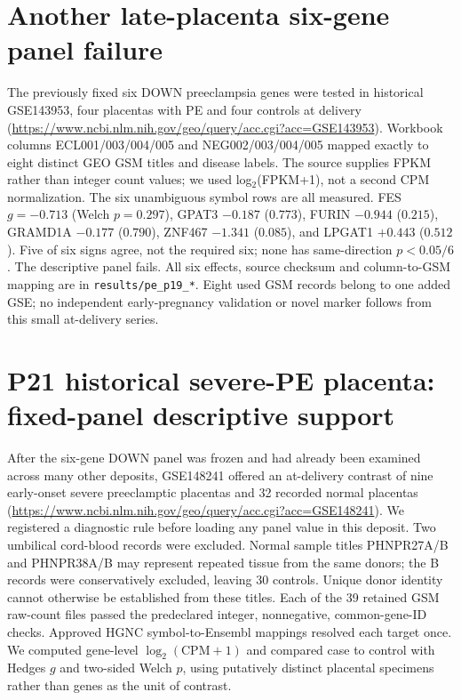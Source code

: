 \documentclass[11pt,a4paper]{article}
\begin{document}
\section{Another late-placenta six-gene panel failure}
The previously fixed six DOWN preeclampsia genes were tested in historical GSE143953, four placentas with PE and four controls at delivery (\url{https://www.ncbi.nlm.nih.gov/geo/query/acc.cgi?acc=GSE143953}). Workbook columns ECL001/003/004/005 and NEG002/003/004/005 mapped exactly to eight distinct GEO GSM titles and disease labels. The source supplies FPKM rather than integer count values; we used log$_2$(FPKM+1), not a second CPM normalization. The six unambiguous symbol rows are all measured. FES $g=-0.713$ (Welch $p=0.297$), GPAT3 $-0.187$ ($0.773$), FURIN $-0.944$ ($0.215$), GRAMD1A $-0.177$ ($0.790$), ZNF467 $-1.341$ ($0.085$), and LPGAT1 $+0.443$ ($0.512$). Five of six signs agree, not the required six; none has same-direction $p<0.05/6$. The descriptive panel fails. All six effects, source checksum and column-to-GSM mapping are in \texttt{results/pe\_p19\_*}. Eight used GSM records belong to one added GSE; no independent early-pregnancy validation or novel marker follows from this small at-delivery series.

\section{P21 historical severe-PE placenta: fixed-panel descriptive support}
After the six-gene DOWN panel was frozen and had already been examined across many other deposits, GSE148241 offered an at-delivery contrast of nine early-onset severe preeclamptic placentas and 32 recorded normal placentas (\url{https://www.ncbi.nlm.nih.gov/geo/query/acc.cgi?acc=GSE148241}). We registered a diagnostic rule before loading any panel value in this deposit. Two umbilical cord-blood records were excluded. Normal sample titles PHNPR27A/B and PHNPR38A/B may represent repeated tissue from the same donors; the B records were conservatively excluded, leaving 30 controls. Unique donor identity cannot otherwise be established from these titles. Each of the 39 retained GSM raw-count files passed the predeclared integer, nonnegative, common-gene-ID checks. Approved HGNC symbol-to-Ensembl mappings resolved each target once. We computed gene-level $\log_2(\mathrm{CPM}+1)$ and compared case to control with Hedges $g$ and two-sided Welch $p$, using putatively distinct placental specimens rather than genes as the unit of contrast.
\end{document}
